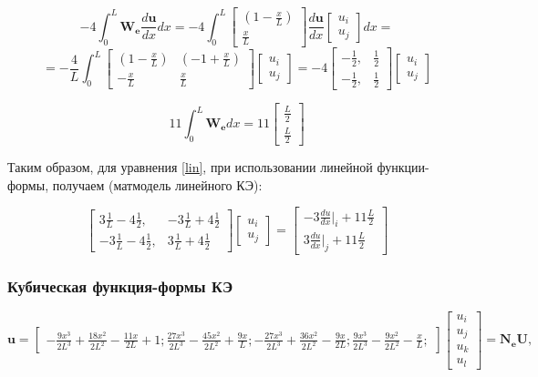 $$
 -4  \int_0^L \mathbf{W_e} \frac{d \mathbf{u}}{dx} dx= -4  \int_0^L
	\begin{bmatrix}
	(1-\frac{x}{L}) \\
	\frac{x}{L}
	\end{bmatrix}
\frac{d \mathbf{u}}{dx}
	\begin{bmatrix}
	u_i \\
	u_j
	\end{bmatrix}
dx
=
$$
$$
=
-\frac{4}{L}  
\int_0^L
\begin{bmatrix}
	(1-\frac{x}{L}) & (-1+\frac{x}{L})\\
	-\frac{x}{L} & \frac{x}{L}
\end{bmatrix}
\begin{bmatrix}
	u_i \\
	u_j
\end{bmatrix}
=
 -4  
\begin{bmatrix}
-\frac{1}{2}, & \frac{1}{2} \\
-\frac{1}{2}, & \frac{1}{2}
\end{bmatrix}
\begin{bmatrix}
u_i \\
u_j
\end{bmatrix}
$$

$$11\int_0^L \mathbf{W_e} d x= 11
\begin{bmatrix}
	\frac{L}{2} \\
	\frac{L}{2}
\end{bmatrix}
$$

Таким образом, для уравнения \ref{lin}, при использовании линейной функции-формы,  получаем (матмодель линейного КЭ):

$$
\begin{bmatrix}
	3\frac{1}{L}  -4   \frac{1}{2}, &   -3 \frac{1}{L}  +4   \frac{1}{2} \\
	  -3  \frac{1}{L} -4   \frac{1}{2}, &  3\frac{1}{L}  +4   \frac{1}{2}
\end{bmatrix}
\begin{bmatrix}
	u_i \\
	u_j
\end{bmatrix}=
\begin{bmatrix}
	  -3 \frac{du}{dx}|_i   +11  \frac{L}{2}\\
	3\frac{du}{dx}|_j   +11  \frac{L}{2}
\end{bmatrix}
$$


\subsubsection{Кубическая функция-формы КЭ}
$$
\mathbf{u}=\begin{bmatrix}
-\frac{9x^3}{2L^3}+\frac{18x^2}{2L^2}-\frac{11x}{2L} + 1;
\frac{27x^3}{2L^3}-\frac{45x^2}{2L^2}+\frac{9x}{L};
-\frac{27x^3}{2L^3}+\frac{36x^2}{2L^2}-\frac{9x}{2L};
\frac{9x^3}{2L^3}-\frac{9x^2}{2L^2}-\frac{x}{L};
\end{bmatrix}
\begin{bmatrix}
u_i \\
u_j\\
u_k\\
u_l
\end{bmatrix}
=\mathbf{N_eU},
$$

